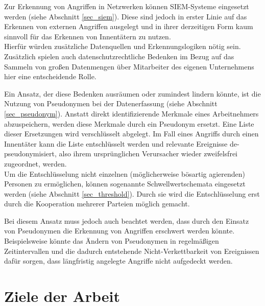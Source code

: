 \documentclass[
    fontsize=12pt,
    headings=small,
    parskip=half,           %
    bibliography=totoc,
    numbers=noenddot,       %
    open=any,               %
   final                   %
    ]{scrreprt}
\begin{document}
Zur Erkennung von Angriffen in Netzwerken können SIEM-Systeme eingesetzt werden (siehe Abschnitt \ref{sec_siem}). Diese sind jedoch in erster Linie auf das Erkennen von externen Angriffen ausgelegt und in ihrer derzeitigen Form kaum sinnvoll für das Erkennen von Innentätern zu nutzen. \\
Hierfür würden zusätzliche Datenquellen und Erkennungslogiken nötig sein. Zusätzlich spielen auch  datenschutzrechtliche Bedenken im Bezug auf das Sammeln von großen Datenmengen über Mitarbeiter des eigenen Unternehmens hier eine entscheidende Rolle. 

Ein Ansatz, der diese Bedenken ausräumen oder zumindest lindern könnte, ist die Nutzung von Pseudonymen bei der Datenerfassung (siehe Abschnitt \ref{sec_pseudonym}). Anstatt direkt identifizierende Merkmale eines Arbeitnehmers abzuspeichern, werden diese Merkmale durch ein Pseudonym ersetzt. Eine Liste dieser Ersetzungen wird verschlüsselt abgelegt. Im Fall eines Angriffs durch einen Innentäter kann die Liste entschlüsselt werden und relevante Ereignisse de-pseudonymisiert, also ihrem ursprünglichen Verursacher wieder zweifelsfrei zugeordnet, werden.\\
Um die Entschlüsselung nicht einzelnen (möglicherweise bösartig agierenden) Personen zu ermöglichen, können sogenannte Schwellwertschemata eingesetzt werden (siehe Abschnitt \ref{sec_threshold}). Durch sie wird die Entschlüsselung erst durch die Kooperation mehrerer Parteien möglich gemacht.

Bei diesem Ansatz muss jedoch auch beachtet werden, dass durch den Einsatz von Pseudonymen die Erkennung von Angriffen erschwert werden könnte. Beispielsweise könnte das Ändern von Pseudonymen in regelmäßigen Zeitintervallen und die dadurch entstehende Nicht-Verkettbarkeit von Ereignissen dafür sorgen, dass längfristig angelegte Angriffe nicht aufgedeckt werden.

\section{Ziele der Arbeit}




\end{document}
